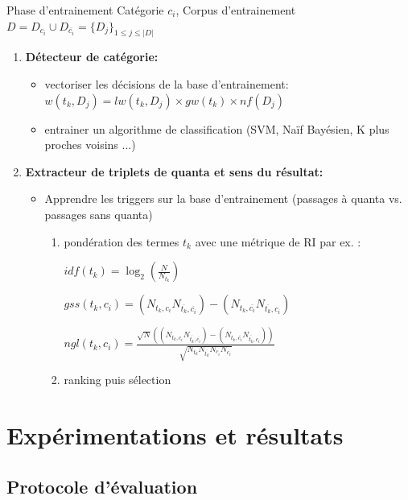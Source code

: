\documentclass[newPxFont,pagenumber]{beamer}
\begin{document}
\begin{frame}{Phase d'entrainement}
Catégorie  $c_i$, Corpus d'entrainement  $D = D_{c_i} \cup D_{\overline{c_i}} = \lbrace D_j\rbrace_{1\leq j\leq \vert D \vert}$
\begin{enumerate}
\item \textbf{Détecteur de catégorie: }
\begin{itemize}
\item vectoriser les décisions de la base d'entrainement: $w(t_k, D_j) = lw(t_k, D_j) \times gw(t_k) \times nf(D_j)$ \cite{salton1988term-weighting}
\item entrainer un algorithme de classification  (SVM, Naïf Bayésien, K plus proches voisins ...)
\end{itemize}
\item \textbf{Extracteur de triplets de quanta et sens du résultat:}
\begin{itemize}
\item Apprendre les triggers sur la base d'entrainement (passages à quanta vs. passages sans quanta)
\begin{enumerate}
\item pondération des termes $t_k$ avec une métrique de RI par ex. :


 $idf(t_k) = \log_2 (\frac{N}{N_{t_k}})$  \cite{sparck1972idf}


 $gss(t_k,c_i) = (N_{t_k,c_i} N_{\overline{t_k},\overline{c_i}}) -  (N_{t_k,\overline{c_i}} N_{\overline{t_k},c_i})$ \cite{galavotti2000gss}

 $ngl(t_k,c_i) = \frac{\sqrt{N} ((N_{t_k,c_i} N_{\overline{t_k},\overline{c_i}}) - (N_{t_k,\overline{c_i}} N_{\overline{t_k},c_i}))}{\sqrt{N_{t_k} N_{\overline{t_k}} N_{c_i} N_{\overline{c_i}}}}$ \cite{ng1997ngl}
\item ranking puis sélection 
\end{enumerate}
\end{itemize}
\end{enumerate}
\end{frame}

\section{Expérimentations et résultats}
\subsection{Protocole d'évaluation}
\end{document}
